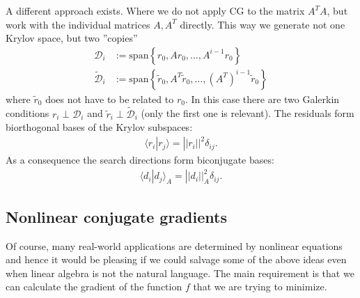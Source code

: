     A different approach exists. Where we do not apply CG to the matrix $A^TA$, but work with the individual matrices $A,A^T$ directly. This way we generate not one Krylov space, but two ''copies''
    \begin{align*}
        \mathcal{D}_i &:= \text{span}\left\{r_0,Ar_0,\ldots,A^{i-1}r_0\right\}\\
        \widetilde{\mathcal{D}}_i &:= \text{span}\left\{\widetilde{r}_0,A^T\widetilde{r}_0,\ldots,(A^T)^{i-1}\widetilde{r}_0\right\}
    \end{align*}
    where $\widetilde{r}_0$ does not have to be related to $r_0$. In this case there are two Galerkin conditions $r_i\perp\mathcal{D}_i$ and $\widetilde{r}_i\perp\widetilde{\mathcal{D}}_i$ (only the first one is relevant). The residuals form biorthogonal bases of the Krylov subspaces:
    \begin{gather}
        \langle r_i|r_j \rangle = ||r_i||^2\delta_{ij}.
    \end{gather}
    As a consequence the search directions form biconjugate bases:
    \begin{gather}
        \langle d_i|d_j \rangle_A = ||d_i||_A^2\delta_{ij}.
    \end{gather}

\subsection{Nonlinear conjugate gradients}

    Of course, many real-world applications are determined by nonlinear equations and hence it would be pleasing if we could salvage some of the above ideas even when linear algebra is not the natural language. The main requirement is that we can calculate the gradient of the function $f$ that we are trying to minimize.

